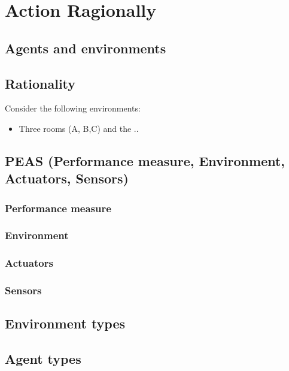 \chapter{Action Ragionally}
\section{Agents and environments}
\section{Rationality}
Consider the following environments:
\begin{itemize}
    \item Three rooms (A, B,C) and the ..
\end{itemize}
\section{PEAS (Performance measure, Environment, Actuators, Sensors)}
\subsection{Performance measure}
\subsection{Environment}
\subsection{Actuators}
\subsection{Sensors}
\section{Environment types}
 
\section{Agent types}